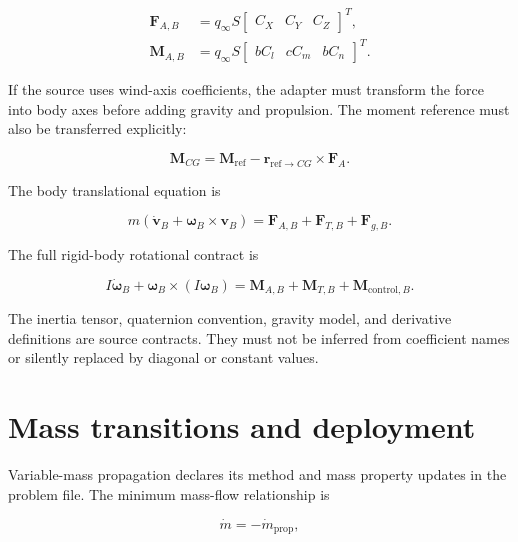 \documentclass[11pt,twoside,openany]{book}
\begin{document}
\begin{align}
  \boldsymbol F_{A,B} &= q_\infty S
    \begin{bmatrix} C_X & C_Y & C_Z \end{bmatrix}^{T},\\
  \boldsymbol M_{A,B} &= q_\infty S
    \begin{bmatrix} b C_l & c C_m & b C_n \end{bmatrix}^{T}.
\end{align}

If the source uses wind-axis coefficients, the adapter must transform the
force into body axes before adding gravity and propulsion. The moment reference
must also be transferred explicitly:

\begin{equation}
  \boldsymbol M_{CG} = \boldsymbol M_{\mathrm{ref}}
    - \boldsymbol r_{\mathrm{ref}\to CG}\times\boldsymbol F_A.
\end{equation}

The body translational equation is

\begin{equation}
  m\left(\dot{\boldsymbol v}_B
    +\boldsymbol\omega_B\times\boldsymbol v_B\right)
  =\boldsymbol F_{A,B}+\boldsymbol F_{T,B}+\boldsymbol F_{g,B}.
\end{equation}

The full rigid-body rotational contract is

\begin{equation}
  I\dot{\boldsymbol\omega}_B
  +\boldsymbol\omega_B\times(I\boldsymbol\omega_B)
  =\boldsymbol M_{A,B}+\boldsymbol M_{T,B}+\boldsymbol M_{\mathrm{control},B}.
\end{equation}

The inertia tensor, quaternion convention, gravity model, and derivative
definitions are source contracts. They must not be inferred from coefficient
names or silently replaced by diagonal or constant values.

\section{Mass transitions and deployment}

Variable-mass propagation declares its method and mass property updates in the
problem file. The minimum mass-flow relationship is

\begin{equation}
  \dot m = -\dot m_{\mathrm{prop}},
\end{equation}
\end{document}
